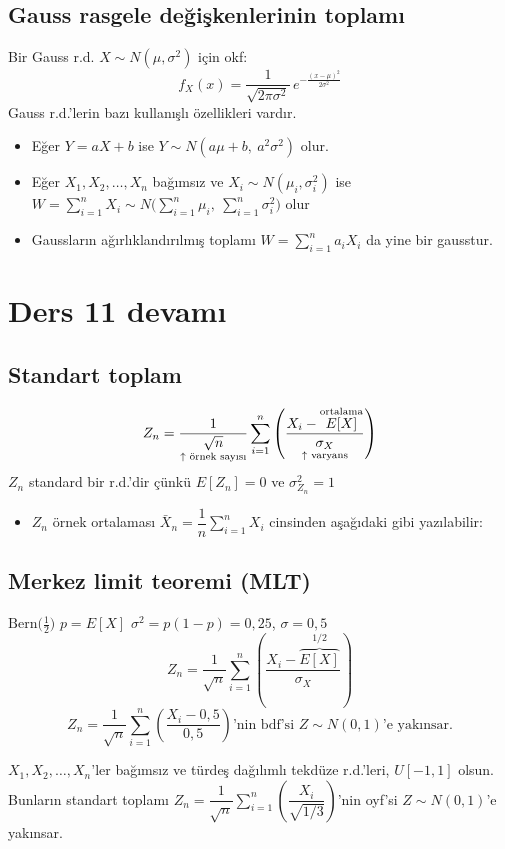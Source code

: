 \documentclass[11pt,a4paper]{article}
\begin{document}
\subsection{Gauss rasgele değişkenlerinin toplamı}
Bir Gauss r.d. $X\sim N(\mu,\sigma^2)$ için okf:
\[ f_X(x)=\frac{1}{\sqrt{2\pi\sigma^2}}\,e^{-\frac{(x-\mu)^2}{2\sigma^2}} \]
Gauss r.d.'lerin bazı kullanışlı özellikleri vardır.
\begin{itemize}
  \item Eğer $Y=aX+b$ ise $Y\sim N(a\mu+b,\ a^2\sigma^2)$ olur.
  \item Eğer $X_1,X_2,\ldots,X_n$ bağımsız ve $X_i\sim N(\mu_i,\sigma_i^2)$ ise $W=\sum_{i=1}^{n}X_i\sim N\Big(\sum_{i=1}^{n}\mu_i,\ \sum_{i=1}^{n}\sigma_i^2\Big)$ olur
  \item Gaussların ağırlıklandırılmış toplamı $W=\sum_{i=1}^{n}a_iX_i$ da yine bir gausstur.
\end{itemize}

\section{Ders 11 devamı}
\subsection{Standart toplam}
\[ Z_n=\frac{1}{\underset{\text{\scriptsize $\uparrow$ örnek sayısı}}{\sqrt{n}}}\sum_{i=1}^{n}\left(\frac{X_i-\overset{\text{\scriptsize ortalama}}{E[X]}}{\underset{\text{\scriptsize $\uparrow$ varyans}}{\sigma_X}}\right) \]
$Z_n$ standard bir r.d.'dir çünkü $E[Z_n]=0$ ve $\sigma_{Z_n}^2=1$
\begin{itemize}
  \item $Z_n$ örnek ortalaması $\bar{X}_n=\dfrac{1}{n}\displaystyle\sum_{i=1}^{n}X_i$ cinsinden aşağıdaki gibi yazılabilir:
\end{itemize}

\subsection{Merkez limit teoremi (MLT)}
\begin{ornek}
  $\mathrm{Bern}\big(\tfrac{1}{2}\big)$ \quad $p=E[X]$ \qquad $\sigma^2=p(1-p)=0{,}25$, \quad $\sigma=0{,}5$
  \[ Z_n=\frac{1}{\sqrt{n}}\sum_{i=1}^{n}\left(\frac{X_i-\overbrace{E[X]}^{1/2}}{\sigma_X}\right) \]
  \[ Z_n=\frac{1}{\sqrt{n}}\sum_{i=1}^{n}\left(\frac{X_i-0{,}5}{0{,}5}\right)\text{'nin bdf'si }Z\sim N(0,1)\text{'e yakınsar.} \]
\end{ornek}
\begin{ornek}
  $X_1,X_2,\ldots,X_n$'ler bağımsız ve türdeş dağılımlı tekdüze r.d.'leri, $U[-1,1]$ olsun. Bunların standart toplamı $Z_n=\dfrac{1}{\sqrt{n}}\displaystyle\sum_{i=1}^{n}\left(\dfrac{X_i}{\sqrt{1/3}}\right)$'nin oyf'si $Z\sim N(0,1)$'e yakınsar.
\end{ornek}
\end{document}
